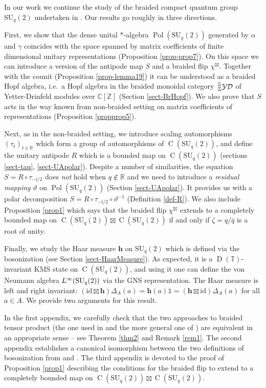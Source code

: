 \documentclass[12pt,reqno,a4paper]{amsart}
\theoremstyle{definition}
\newcommand{\comp}{\circ}
\newcommand{\I}{\mathds{1}}
\newcommand{\id}{\mathrm{id}}
\newcommand{\ii}{\mathrm{i}}
\newcommand{\CC}{\mathbb{C}}
\newcommand{\RR}{\mathbb{R}}
\newcommand{\TT}{\mathbb{T}}
\newcommand{\ZZ}{\mathbb{Z}}
\newcommand{\bh}{{\boldsymbol{h}}}
\DeclareMathOperator{\C}{C}
\DeclareMathOperator{\D}{D}
\DeclareMathOperator{\Linf}{\mathnormal{L}^{\infty}}
\DeclareMathOperator{\Pol}{Pol}
\newcommand{\SU}{\mathrm{SU}}
\numberwithin{equation}{section}
\begin{document}
In our work we continue the study of the braided compact quantum group $\SU_q(2)$ undertaken in \cite{BraidedSU2}. Our results go roughly in three directions.

First, we show that the dense unital $*$-algebra $\Pol(\SU_q(2))$ generated by $\alpha$ and $\gamma$ coincides with the space spanned by matrix coefficients of finite dimensional unitary representations (Proposition \ref{prop-prop7}). On this space we can introduce a version of the antipode map $S$ and a braided flip $\chi^{\boxtimes}$. Together with the counit (Proposition \ref{prop-lemma19}) it can be understood as a braided Hopf algebra, i.e.~a Hopf algebra in the braided monoidal category $\sideset{_\ZZ^\ZZ}{}{\operatorname{\mathcal{YD}}}$ of Yetter-Drinfeld modules over $\CC[\ZZ]$ (Section \ref{sect-BrHopf}). We also prove that $S$ acts in the way known from non-braided setting on matrix coefficients of representations (Proposition \ref{propprop5}).

Next, as in the non-braided setting, we introduce scaling automorphisms $(\tau_t)_{t\in\RR}$ which form a group of automorphisms of $\C(\SU_q(2))$, and define the unitary antipode $R$ which is a bounded map on $\C(\SU_q(2))$ (sections \ref{sect-tau}, \ref{sect-UApolar}). Despite a number of similarities, the equation $S=R\comp\tau_{-\ii/2}$ does \emph{not} hold when $q\not\in\RR$ and we need to introduce a \emph{residual mapping} $\vartheta$ on $\Pol(\SU_q(2))$ (Section \ref{sect-UApolar}). It provides us with a polar decomposition $S=R\comp\tau_{-\ii/2}\comp\vartheta^{-1}$ (Definition \ref{def-R}). We also include Proposition \ref{prop1} which says that the braided flip $\chi^\boxtimes$ extends to a completely bounded map on $\C(\SU_q(2))\boxtimes\C(\SU_q(2))$ if and only if $\zeta=q/\overline{q}$ is a root of unity.

Finally, we study the Haar measure $\bh$ on $\SU_q(2)$ which is defined via the bosonization (see Section \ref{sect-HaarMeasure}). As expected, it is a $\D(\TT)$-invariant KMS state on $\C(\SU_q(2))$, and using it one can define the von Neumann algebra $\Linf(\SU_q(2))$ via the GNS representation. The Haar measure is left and right invariant: $(\id\boxtimes\bh)\Delta_A(a)=\bh(a)\I=(\bh\boxtimes\id)\Delta_A(a)$ for all $a\in A$. We provide two arguments for this result.

In the first appendix, we carefully check that the two approaches to braided tensor product (the one used in \cite{BraidedSU2} and the more general one of \cite{MeyerRoyWoronowiczI,MeyerRoyWoronowiczII,DeCommerKrajczok}) are equivalent in an appropriate sense -- see Theorem \ref{thm2} and Remark \ref{rem1}. The second appendix establishes a canonical isomorphism between the two definitions of bosonization from \cite{BraidedSU2} and \cite{MeyerRoyWoronowiczII}. The third appendix is devoted to the proof of Proposition \ref{prop1} describing the conditions for the braided flip to extend to a completely bounded map on $\C(\SU_q(2))\boxtimes \C(\SU_q(2))$.
\end{document}

